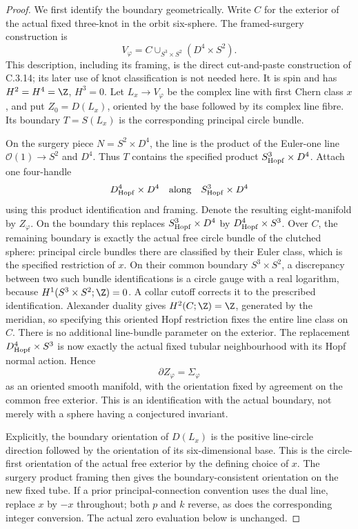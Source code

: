 \begin{proof}
We first identify the boundary geometrically. Write $C$ for the
exterior of the actual fixed three-knot in the orbit six-sphere.
The framed-surgery construction is
\[
 V_\varphi=C\cup_{S^3\times S^2}(D^4\times S^2).
\]
This description, including its framing, is the direct cut-and-paste
construction of C.3.14; its later use of knot classification is not
needed here. It is spin and has $H^2=H^4=\Z$, $H^3=0$.
Let $L_x\to V_\varphi$ be the complex line with first Chern class
$x$, and put $Z_0=D(L_x)$, oriented by the base followed by its
complex line fibre. Its boundary $T=S(L_x)$ is the corresponding
principal circle bundle.

On the surgery piece $N=S^2\times D^4$, the line is the product
of the Euler-one line $\mathcal O(1)\to S^2$ and $D^4$.
Thus $T$ contains the specified product $S^3_{\rm Hopf}\times D^4$.
Attach one four-handle
\[
 D^4_{\rm Hopf}\times D^4
 \quad\hbox{along}\quad S^3_{\rm Hopf}\times D^4
\]
using this product identification and framing. Denote the resulting
eight-manifold by $Z_\varphi$. On the boundary this replaces
$S^3_{\rm Hopf}\times D^4$ by $D^4_{\rm Hopf}\times S^3$.
Over $C$, the remaining boundary is exactly the actual free circle
bundle of the clutched sphere: principal circle bundles there are
classified by their Euler class, which is the specified restriction
of $x$. On their common boundary $S^3\times S^2$, a discrepancy
between two such bundle identifications is a circle gauge with a
real logarithm, because $H^1(S^3\times S^2;\Z)=0$.
A collar cutoff corrects it to the prescribed identification.
Alexander duality gives $H^2(C;\Z)=\Z$, generated by the
meridian, so specifying this oriented Hopf restriction fixes the
entire line class on $C$. There is no additional line-bundle
parameter on the exterior. The replacement
$D^4_{\rm Hopf}\times S^3$ is now exactly the
actual fixed tubular neighbourhood with its Hopf normal action.
Hence
\[
 \partial Z_\varphi=\Sigma_\varphi
\]
as an oriented smooth manifold, with the orientation fixed by
agreement on the common free exterior. This is an identification
with the actual boundary, not merely with a sphere having a
conjectured invariant.

Explicitly, the boundary orientation of $D(L_x)$ is the positive
line-circle direction followed by the orientation of its
six-dimensional base. This is the circle-first orientation of
the actual free exterior by the defining choice of $x$.
The surgery product framing then gives the boundary-consistent
orientation on the new fixed tube. If a prior principal-connection
convention uses the dual line, replace $x$ by $-x$ throughout;
both $p$ and $k$ reverse, as does the corresponding integer
conversion. The actual zero evaluation below is unchanged.


\end{proof}
